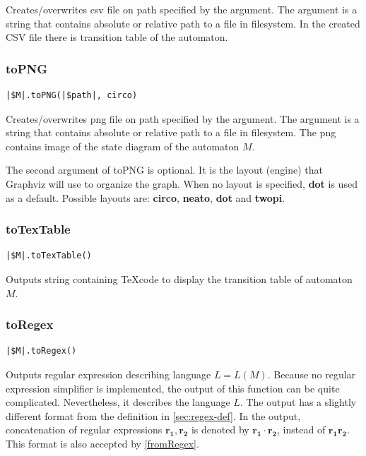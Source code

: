\documentclass{ctuthesis}
\begin{document}
Creates/overwrites csv file on path specified by the argument. The argument is a string that contains absolute or relative path to a file in filesystem. In the created CSV file there is transition table of the automaton.

\subsubsection{toPNG}
\begin{lstlisting}[language = JASL_snippet]
	|$M|.toPNG(|$path|, circo)
\end{lstlisting}

Creates/overwrites png file on path specified by the argument. The argument is a string that contains absolute or relative path to a file in filesystem. The png contains image of the state diagram of the automaton $M$. 

The second argument of toPNG is optional. It is the layout (engine) that Graphviz will use to organize the graph. When no layout is specified, \textbf{dot} is used as a default. Possible layouts are: \textbf{circo}, \textbf{neato}, \textbf{dot} and \textbf{twopi}.

\subsubsection{toTexTable}
\begin{lstlisting}[language = JASL_snippet]
	|$M|.toTexTable()
\end{lstlisting}

Outputs string containing \TeX code to display the transition table of automaton $M$. 

\subsubsection{toRegex}
\label{toRegex}
\begin{lstlisting}[language = JASL_snippet]
	|$M|.toRegex()
\end{lstlisting}

Outputs regular expression describing language $L = L(M)$. Because no regular expression simplifier is implemented, the output of this function can be quite complicated. Nevertheless, it describes the language $L$. The output has a slightly different format from the definition in \ref{sec:regex-def}. In the output, concatenation of regular expressions $\mathbf{r_1}, \mathbf{r_2}$ is denoted by $\mathbf{r_1}\cdot \mathbf{r_2}$, instead of $\mathbf{r_1r_2}$. This format is also accepted by \ref{fromRegex}.
\end{document}
